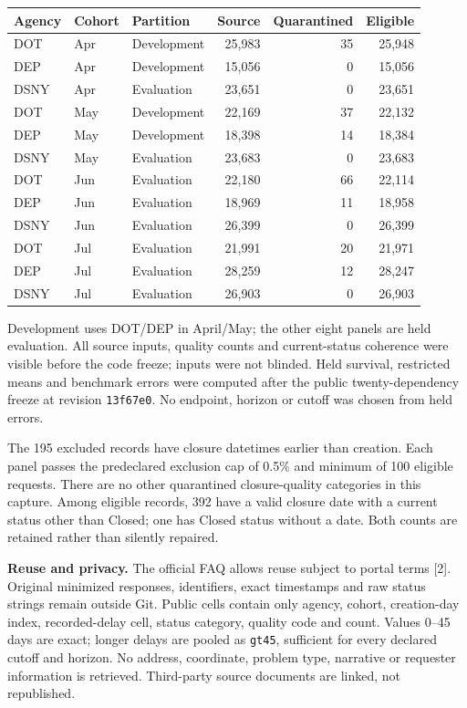 \documentclass[10pt,letterpaper]{article}
\begin{document}
\begin{center}\small\begin{tabular}{lllrrr}\toprule
Agency & Cohort & Partition & Source & Quarantined & Eligible\\\midrule
DOT & Apr & Development & 25,983 & 35 & 25,948\\
DEP & Apr & Development & 15,056 & 0 & 15,056\\
DSNY & Apr & Evaluation & 23,651 & 0 & 23,651\\
DOT & May & Development & 22,169 & 37 & 22,132\\
DEP & May & Development & 18,398 & 14 & 18,384\\
DSNY & May & Evaluation & 23,683 & 0 & 23,683\\
DOT & Jun & Evaluation & 22,180 & 66 & 22,114\\
DEP & Jun & Evaluation & 18,969 & 11 & 18,958\\
DSNY & Jun & Evaluation & 26,399 & 0 & 26,399\\
DOT & Jul & Evaluation & 21,991 & 20 & 21,971\\
DEP & Jul & Evaluation & 28,259 & 12 & 28,247\\
DSNY & Jul & Evaluation & 26,903 & 0 & 26,903\\
\bottomrule\end{tabular}\end{center}

Development uses DOT/DEP in April/May; the other eight panels are held evaluation. All source inputs, quality counts and current-status coherence were visible before the code freeze; inputs were not blinded. Held survival, restricted means and benchmark errors were computed after the public twenty-dependency freeze at revision \texttt{13f67e0}. No endpoint, horizon or cutoff was chosen from held errors.

The 195 excluded records have closure datetimes earlier than creation. Each panel passes the predeclared exclusion cap of 0.5\% and minimum of 100 eligible requests. There are no other quarantined closure-quality categories in this capture. Among eligible records, 392 have a valid closure date with a current status other than Closed; one has Closed status without a date. Both counts are retained rather than silently repaired.

\textbf{Reuse and privacy.} The official FAQ allows reuse subject to portal terms [2]. Original minimized responses, identifiers, exact timestamps and raw status strings remain outside Git. Public cells contain only agency, cohort, creation-day index, recorded-delay cell, status category, quality code and count. Values 0--45 days are exact; longer delays are pooled as \texttt{gt45}, sufficient for every declared cutoff and horizon. No address, coordinate, problem type, narrative or requester information is retrieved. Third-party source documents are linked, not republished.
\end{document}
